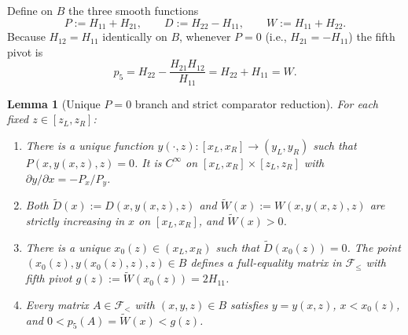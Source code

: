 \documentclass[11pt]{article}
\newtheorem{lemma}[theorem]{Lemma}
\theoremstyle{remark}
\begin{document}
Define on $B$ the three smooth functions
\[
  P := H_{11}+H_{21},\qquad D := H_{22}-H_{11},\qquad W := H_{11}+H_{22}.
\]
Because $H_{12}=H_{11}$ identically on $B$, whenever $P=0$ (i.e., $H_{21}=-H_{11}$)
the fifth pivot is
\[
  p_5 = H_{22} - \frac{H_{21}H_{12}}{H_{11}} = H_{22} + H_{11} = W.
\]

\begin{lemma}[Unique $P=0$ branch and strict comparator reduction]\label{lem:branch}
For each fixed $z\in[z_L,z_R]$:
\begin{enumerate}
  \item There is a unique function $y(\cdot,z)\colon [x_L,x_R]\to (y_L,y_R)$
  such that $P(x,y(x,z),z)=0$. It is $C^\infty$ on $[x_L,x_R]\times[z_L,z_R]$
  with $\partial y/\partial x = -P_x/P_y$.
  \item Both $\tilde{D}(x):=D(x,y(x,z),z)$ and $\tilde{W}(x):=W(x,y(x,z),z)$
  are strictly increasing in $x$ on $[x_L,x_R]$, and $\tilde{W}(x)>0$.
  \item There is a unique $x_0(z)\in(x_L,x_R)$ such that $\tilde{D}(x_0(z))=0$.
  The point $(x_0(z),y(x_0(z),z),z)\in B$ defines a full-equality matrix in
  $\mathcal{F}_{\le}$ with fifth pivot $g(z):=\tilde{W}(x_0(z))=2H_{11}$.
  \item Every matrix $A\in\mathcal{F}_{<}$ with $(x,y,z)\in B$ satisfies
  $y=y(x,z)$, $x<x_0(z)$, and $0 < p_5(A) = \tilde{W}(x) < g(z)$.
\end{enumerate}
\end{lemma}
\end{document}
